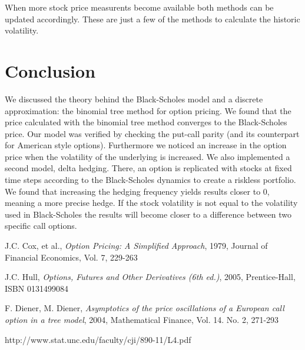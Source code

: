 \documentclass[11pt,a4paper]{article}
\begin{document}
When more stock price measurents become available both methods can be updated accordingly. These are just a few of the methods to calculate the historic volatility.

\section{Conclusion}

We discussed the theory behind the Black-Scholes model and a discrete approximation: the binomial tree method for option pricing. We found that the price calculated with the binomial tree method converges to the Black-Scholes price. Our model was verified by checking the put-call parity (and its counterpart for American style options). Furthermore we noticed an increase in the option price when the volatility of the underlying is increased. We also implemented a second model, delta hedging. There, an option is replicated with stocks at fixed time steps according to the Black-Scholes dynamics to create a riskless portfolio. We found that increasing the hedging frequency yields results closer to 0, meaning a more precise hedge. If the stock volatility is not equal to the volatility used in Black-Scholes the results will become closer to a difference between two specific call options.

\begin{thebibliography}{10}
  J.C. Cox, et al., \emph{Option Pricing: A Simplified Approach}, 1979, Journal of Financial Economics, Vol. 7, 229-263

  J.C. Hull, \emph{Options, Futures and Other Derivatives (6th ed.)}, 2005, Prentice-Hall, ISBN 0131499084

  F. Diener, M. Diener, \emph{Asymptotics of the price oscillations of a European call option in a tree model}, 2004, Mathematical Finance, Vol. 14. No. 2, 271-293

  http://www.stat.unc.edu/faculty/cji/890-11/L4.pdf

\end{thebibliography}
\end{document}
